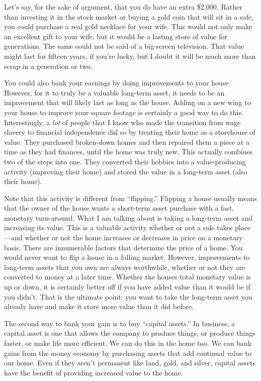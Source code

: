 \documentclass[letterpaper]{article}
\begin{document}
{\color{black}
Let’s say, for the sake of argument, that you do have an extra \$2,000.
Rather than investing it in the stock market or buying a gold coin that
will sit in a safe, you could purchase a real gold necklace for your
wife. This would not only make an excellent gift to your wife, but it
would be a lasting store of value for generations. The same could not
be said of a big-screen television. That value might last for fifteen
years, if you’re lucky, but I doubt it will be much more than scrap in
a generation or two. }

{\color{black}
You could also bank your earnings by doing improvements to your house.
However, for it to truly be a valuable long-term asset, it needs to be
an improvement that will likely last as long as the house. Adding on a
new wing to your house to improve your square footage is certainly a
good way to do this. Interestingly, a \textit{lot} of people that I
know who made the transition from wage slavery to financial
independence did so by treating their home as a storehouse of value.
They purchased broken-down homes and then repaired them a piece at a
time as they had finances, until the home was truly new. This actually
combines two of the steps into one. They converted their hobbies into a
value-producing activity (improving their home) and stored the value in
a long-term asset (also their home). }

{\color{black}
Note that this activity is different from “flipping.”  Flipping a house
usually means that the owner of the house wants a short-term asset
purchase with a fast, monetary turn-around. What I am talking about is
taking a long-term asset and increasing its value. This is a valuable
activity whether or not a sale takes place—and whether or not the home
increases or decreases in price on a monetary basis. There are
innumerable factors that determine the price of a home. You would never
want to flip a house in a falling market. However, improvements to
long-term assets that you own are always worthwhile, whether or not
they are converted to money at a later time. Whether the
house{\textquotesingle}s total monetary value is up or down, it is
certainly better off if you have added value than it would be if you
didn’t. That is the ultimate point: you want to take the long-term
asset you already have and make it store more value than it did
before.}

{\color{black}
The second way to bank your gain is to buy “capital assets.”  In
business, a capital asset is one that allows the company to produce
things, or produce things faster, or make life more efficient. We can
do this in the home too. We can bank gains from the money economy by
purchasing assets that add continual value to our home. Even if they
aren’t permanent like land, gold, and silver, capital assets have the
benefit of providing increased value to the home. }
\end{document}
